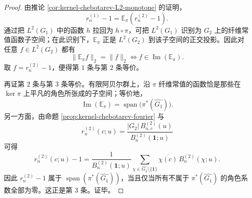 \begin{proof}
由推论 \ref{cor:kernel-chebotarev-L2-monotone} 的证明，
\[
r_n^{(1)}-1=\mathbb E_\pi(r_n^{(2)}-1).
\]
通过把 \(L^2(G_1)\) 中的函数 \(h\) 拉回为 \(h\circ\pi\)，可把 \(L^2(G_1)\) 识别为 \(G_2\) 上的纤维常值函数子空间；在此识别下，\(\mathbb E_\pi\) 正是 \(L^2(G_2)\) 到该子空间的正交投影。因此对任意 \(f\in L^2(G_2)\) 都有
\[
\|\mathbb E_\pi f\|_2=\|f\|_2
\iff
f\in \operatorname{Im}(\mathbb E_\pi).
\]
取 \(f=r_n^{(2)}-1\)，便得第 \(1\) 条与第 \(2\) 条等价。

再证第 \(2\) 条与第 \(3\) 条等价。有限阿贝尔群上，沿 \(\pi\) 纤维常值的函数恰是那些在 \(\ker\pi\) 上平凡的角色所张成的子空间；等价地，
\[
\operatorname{Im}(\mathbb E_\pi)
=
\operatorname{span}\bigl(\pi^\ast(\widehat{G_1})\bigr).
\]
另一方面，由命题 \ref{prop:kernel-chebotarev-fourier} 与
\[
r_n^{(2)}(c;u)
=
\frac{|G_2|\,B_{n,c}^{(2)}(u)}{B_n^{(2)}(\mathbf{1};u)}
\]
可得
\[
r_n^{(2)}(c;u)-1
=
\frac{1}{B_n^{(2)}(\mathbf{1};u)}
\sum_{\chi\in \widehat{G_2}\setminus\{\mathbf 1\}}
\overline{\chi(c)}\,B_n^{(2)}(\chi;u).
\]
因此 \(r_n^{(2)}-1\) 属于 \(\operatorname{span}(\pi^\ast(\widehat{G_1}))\)，当且仅当所有不属于 \(\pi^\ast(\widehat{G_1})\) 的角色系数全部为零。这正是第 \(3\) 条。证毕。
\end{proof}

